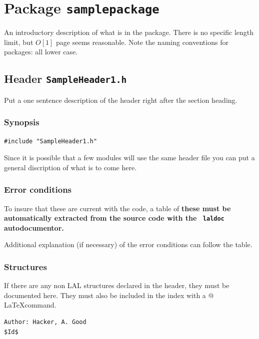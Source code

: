 \documentclass[oneside]{book}
\begin{document}
\chapter{Package {\texttt {samplepackage}}}
\label{c:SamplePackage}

An introductory description of what is in the package.
There is no specific length limit, but $O[1]$ page seems
reasonable. Note the naming conventions for packages: all lower case. 


\newpage

\section{Header {\texttt {SampleHeader1.h}}}
Put a one sentence description of the header right after the section
heading.

\subsection*{Synopsis}

\begin{verbatim}
#include "SampleHeader1.h"
\end{verbatim}
Since it is possible that a few modules will use the same header file
you can put a general discription of what is to come here.

\subsection*{Error conditions}
To insure that these are current with the code, a table of {\bf these
must be automatically extracted from the source code with the {\tt
laldoc} autodocumentor.}

Additional explanation (if necessary) of the error conditions can
follow the table.

\subsection*{Structures}

If there are any non LAL structures declared in the header, they must
be documented here.  They must also be included in the index with a
\verb@{}@ \LaTeX command.

\vfill{\footnotesize{
\vspace{-1ex}
\mbox{}
\vspace{-3ex}
\begin{verbatim}
Author: Hacker, A. Good
$Id$
\end{verbatim}
}}
\end{document}
